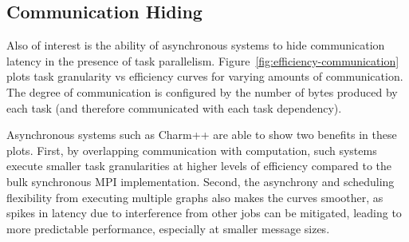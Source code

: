 \subsection{Communication Hiding}



Also of interest is the ability of asynchronous systems to
hide communication latency in the presence of task
parallelism. Figure~\ref{fig:efficiency-communication} plots task
granularity vs efficiency curves for varying amounts of
communication. The degree of communication is configured by the number
of bytes produced by each task (and therefore communicated with each
task dependency).

Asynchronous systems such as Charm++ are able to show two benefits in
these plots. First, by overlapping communication with computation,
such systems execute smaller task granularities at higher
levels of efficiency compared to the bulk synchronous MPI
implementation. Second, the asynchrony and scheduling flexibility from
executing multiple graphs also makes the curves smoother,
as spikes in latency due to interference from other jobs can be
mitigated, leading to more predictable performance, especially at
smaller message sizes.
